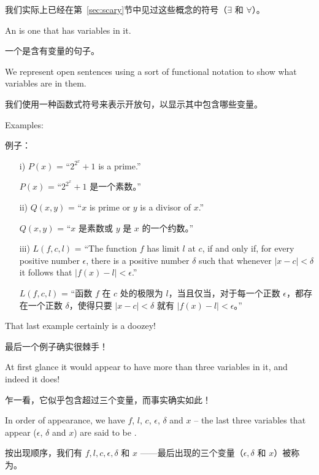 我们实际上已经在第~\ref{sec:scary}节中见过这些概念的符号（$\exists$ 和 $\forall$）。

An  
is one that has variables in it.

一个是含有变量的句子。

We represent 
open sentences using a sort of functional notation to show what
variables are in them.

我们使用一种函数式符号来表示开放句，以显示其中包含哪些变量。

Examples:

例子：

\begin{enumerate}

\item[i)] $P(x)$ = ``$2^{2^x}+1$ is a prime.''

$P(x)$ = “$2^{2^x}+1$ 是一个素数。”

\item[ii)] $Q(x,y)$ = ``$x$ is prime or $y$ is a divisor of $x$.''

$Q(x,y)$ = “$x$ 是素数或 $y$ 是 $x$ 的一个约数。”

\item[iii)] $L(f,c,l)$ = ``The function $f$ has limit $l$ at $c$, if 
and only if, 
for every positive number $\epsilon$, there is a positive number $\delta$ 
such that whenever $|x-c| < \delta$ it follows that $|f(x)-l| < \epsilon$.''  

$L(f,c,l)$ = “函数 $f$ 在 $c$ 处的极限为 $l$，当且仅当，对于每一个正数 $\epsilon$，都存在一个正数 $\delta$，使得只要 $|x-c| < \delta$ 就有 $|f(x)-l| < \epsilon$。”
\end{enumerate}

That last example certainly is a doozey!

最后一个例子确实很棘手！

At first glance it would appear
to have more than three variables in it, and indeed it does!

乍一看，它似乎包含超过三个变量，而事实确实如此！

In order of
appearance, we have $f$, $l$, $c$, $\epsilon$, $\delta$ and $x$ -- the 
last three variables that appear ($\epsilon$, $\delta$ and $x$) are said
to be .

按出现顺序，我们有 $f, l, c, \epsilon, \delta$ 和 $x$ ——最后出现的三个变量（$\epsilon, \delta$ 和 $x$）被称为。

